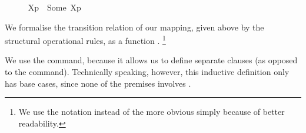 \begin{isabellebody}
\ \ {\isacharparenleft}{\kern0pt}{\isacartoucheopen}{\isasymtheta}{\isacharbrackleft}{\kern0pt}{\isacharunderscore}{\kern0pt}{\isacharbrackright}{\kern0pt}{\isacharprime}{\kern0pt}{\isacharparenleft}{\kern0pt}{\isacharunderscore}{\kern0pt}{\isacharprime}{\kern0pt}{\isacharparenright}{\kern0pt}{\isacartoucheclose}{\isacharparenright}{\kern0pt}\isanewline
\ \ \ {\isacartoucheopen}{\isasymtheta}{\isacharbrackleft}{\kern0pt}X{\isacharbrackright}{\kern0pt}{\isacharparenleft}{\kern0pt}p{\isacharparenright}{\kern0pt}\ {\isasymequiv}\ {\isasymtheta}{\isacharquery}{\kern0pt}{\isacharbrackleft}{\kern0pt}Some\ X{\isacharbrackright}{\kern0pt}{\isacharparenleft}{\kern0pt}p{\isacharparenright}{\kern0pt}{\isacartoucheclose}\isanewline
\isanewline
%
\isadelimunimportant
%
\endisadelimunimportant
%
\isatagunimportant
%
\endisatagunimportant
{\isafoldunimportant}%
%
\isadelimunimportant
%
\endisadelimunimportant
%
\isadelimdocument
%
\endisadelimdocument
%
\isatagdocument
%
\isamarkuptrue%
%
\endisatagdocument
{\isafolddocument}%
%
\isadelimdocument
%
\endisadelimdocument
%
\begin{isamarkuptext}%
We formalise the transition relation of our mapping, given above by the structural operational rules, as a function .%
\footnote{We use the notation \isa{{\isacharunderscore}{\kern0pt}\ {\isasymlongmapsto}\isactrlsup {\isasymtheta}{\isacharunderscore}{\kern0pt}\ {\isacharunderscore}{\kern0pt}} instead of the more obvious \isa{{\isacharunderscore}{\kern0pt}\ {\isasymlongmapsto}\isactrlsub {\isasymtheta}{\isacharunderscore}{\kern0pt}\ {\isacharunderscore}{\kern0pt}} simply because of better readability.}

We use the  command, because it allows us to define separate clauses (as opposed to the  command). Technically speaking, however, this inductive definition only has base cases, since none of the premises involves \isa{{\isasymlongmapsto}\isactrlsup {\isasymtheta}}.


\end{isamarkuptext}
\end{isabellebody}
